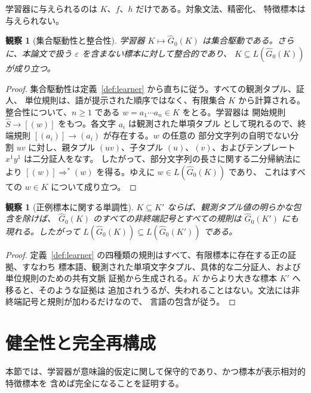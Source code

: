 \documentclass[11pt,a4paper]{ltjsarticle}
\newtheorem{observation}[theorem]{観察}
\theoremstyle{remark}
\newcommand{\eps}{\varepsilon}
\begin{document}
学習器に与えられるのは \(K\)、\(f\)、\(h\) だけである。対象文法、精密化、
特徴標本は与えられない。

\begin{observation}[集合駆動性と整合性]
\label{obs:set-driven-consistent}
学習器 \(K\mapsto\widehat G_0(K)\) は集合駆動である。さらに、本論文で扱う
\(\eps\) を含まない標本に対して整合的であり、
\(K\subseteq L(\widehat G_0(K))\) が成り立つ。
\end{observation}

\begin{proof}
集合駆動性は定義~\ref{def:learner} から直ちに従う。すべての観測タプル、証人、
単位規則は、語が提示された順序ではなく、有限集合 \(K\) から計算される。
整合性について、\(n\ge1\) である \(w=a_1\cdots a_n\in K\) をとる。学習器は
開始規則 \(\widehat S\to[(w)]\) をもつ。各文字 \(a_i\) は観測された単項タプル
として現れるので、終端規則 \([(a_i)]\to(a_i)\) が存在する。\(w\) の任意の
部分文字列の自明でない分割 \(uv\) に対し、親タプル \((uv)\)、子タプル
\((u)\)、\((v)\)、およびテンプレート \(x^1y^1\) は二分証人をなす。
したがって、部分文字列の長さに関する二分帰納法により
\([(w)]\Rightarrow^*(w)\) を得る。ゆえに \(w\in L(\widehat G_0(K))\) であり、
これはすべての \(w\in K\) について成り立つ。
\end{proof}

\begin{observation}[正例標本に関する単調性]
\label{obs:learner-monotone}
\(K\subseteq K'\) ならば、観測タプル値の明らかな包含を除けば、
\(\widehat G_0(K)\) のすべての非終端記号とすべての規則は
\(\widehat G_0(K')\) にも現れる。したがって
\(L(\widehat G_0(K))\subseteq L(\widehat G_0(K'))\) である。
\end{observation}

\begin{proof}
定義~\ref{def:learner} の四種類の規則はすべて、有限標本に存在する正の証拠、すなわち
標本語、観測された単項文字タプル、具体的な二分証人、および単位規則のための共有文脈
証拠から生成される。\(K\) からより大きな標本 \(K'\) へ移ると、そのような証拠は
追加されうるが、失われることはない。文法には非終端記号と規則が加わるだけなので、
言語の包含が従う。
\end{proof}

\section{健全性と完全再構成}
\label{sec:exact}

本節では、学習器が意味論的仮定に関して保守的であり、かつ標本が表示相対的特徴標本を
含めば完全になることを証明する。
\end{document}
